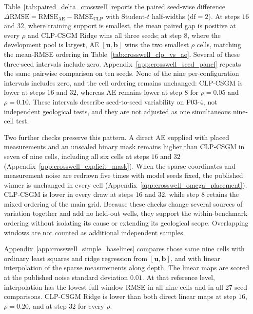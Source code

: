 Table~\ref{tab:paired_delta_crosswell} reports the paired seed-wise difference
$\Delta\mathrm{RMSE}=\mathrm{RMSE}_{\mathrm{AE}}-\mathrm{RMSE}_{\mathrm{CLP}}$
with Student-$t$ half-widths ($\mathrm{df}=2$). At steps $16$ and $32$, where
training support is smallest, the
mean paired gap is positive at every $\rho$ and CLP-CSGM Ridge wins all three
seeds; at step $8$, where the development pool is largest, AE $[\boldsymbol{u},\boldsymbol{b}]$ wins the two
smallest $\rho$ cells, matching the mean-RMSE ordering in Table~\ref{tab:crosswell_clp_vs_ae}.
Several of these three-seed intervals include zero.
Appendix~\ref{app:crosswell_seed_panel} repeats the same pairwise comparison
on ten seeds. None of the nine per-configuration intervals includes zero,
and the cell ordering remains unchanged: CLP-CSGM is lower at steps $16$ and
$32$, whereas AE remains lower at step $8$ for $\rho=0.05$ and
$\rho=0.10$. These intervals describe seed-to-seed variability on F03-4,
not independent geological tests, and they are not adjusted as one
simultaneous nine-cell test.

Two further checks preserve this pattern. A direct AE supplied with placed
measurements and an unscaled binary mask remains higher than CLP-CSGM in
seven of nine cells, including all six cells at steps $16$ and $32$
(Appendix~\ref{app:crosswell_explicit_mask}). When the sparse coordinates
and measurement noise are redrawn five times with model seeds fixed, the
published winner is unchanged in every cell
(Appendix~\ref{app:crosswell_omega_placement}). CLP-CSGM is lower in every
draw at steps $16$ and $32$, while step $8$ retains the mixed ordering of
the main grid. Because these checks change several sources of variation
together and add no held-out wells, they support the within-benchmark
ordering without isolating its cause or extending its geological scope.
Overlapping windows are not counted as additional independent samples.

Appendix~\ref{app:crosswell_simple_baselines} compares those same nine cells
with ordinary least squares and ridge regression from
$[\boldsymbol{u},\boldsymbol{b}]$, and with linear interpolation of the
sparse measurements along depth. The linear maps are scored at the published
noise standard deviation $0.01$. At that reference level, interpolation has
the lowest full-window RMSE in all nine cells and in all $27$ seed
comparisons. CLP-CSGM Ridge is lower than both direct linear maps at step
$16$, $\rho=0.20$, and at step $32$ for every $\rho$.

